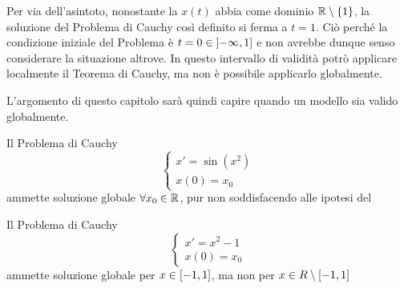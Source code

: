 \begin{example}
	Per via dell'asintoto, nonostante la $x(t)$ abbia come dominio $\mathbb{R} \setminus \left\{1\right\}$, la soluzione del Problema di Cauchy così definito si ferma a $t=1$. Ciò perché la condizione iniziale del Problema è $t = 0 \in \left]-\infty,1\right]$ e non avrebbe dunque senso considerare la situazione altrove. In questo intervallo di validità potrò applicare localmente il Teorema di Cauchy, ma non è possibile applicarlo globalmente.
	\begin{note}
		L'argomento di questo capitolo sarà quindi capire quando un modello sia valido globalmente.
	\end{note}
\end{example}
\begin{example}
	Il Problema di Cauchy
	\[
		\begin{cases}
			x' = \sin(x^2)\\
			x(0) = x_0
		\end{cases}
	\]
	ammette soluzione globale $\forall x_0 \in \mathbb{R}$, pur non soddisfacendo alle ipotesi del 
\end{example}
\begin{example}
	Il Problema di Cauchy
	\[
		\begin{cases}
			x' = x^2 - 1\\
			x(0) = x_0
		\end{cases}
	\]
	ammette soluzione globale per $x \in \left[-1,1\right]$, ma non per $x \in R \setminus \left[-1,1\right]$
\end{example}

\cbstart
